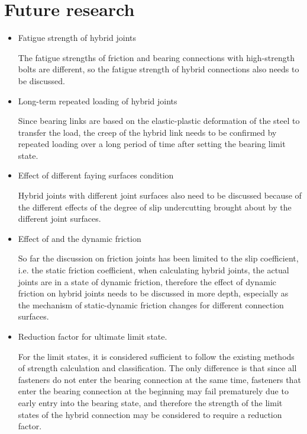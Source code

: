 \section{Future research}

\begin{itemize}


\item Fatigue strength of hybrid joints

The fatigue strengths of friction and bearing connections with high-strength bolts are different, so the fatigue strength of hybrid connections also needs to be discussed.

\item Long-term repeated loading of hybrid joints

Since bearing links are based on the elastic-plastic deformation of the steel to transfer the load, the creep of the hybrid link needs to be confirmed by repeated loading over a long period of time after setting the bearing limit state.

\item Effect of different faying surfaces condition

Hybrid joints with different joint surfaces also need to be discussed because of the different effects of the degree of slip undercutting brought about by the different joint surfaces.

\item Effect of and the dynamic friction

So far the discussion on friction joints has been limited to the slip coefficient, i.e. the static friction coefficient, when calculating hybrid joints, the actual joints are in a state of dynamic friction, therefore the effect of dynamic friction on hybrid joints needs to be discussed in more depth, especially as the mechanism of static-dynamic friction changes for different connection surfaces.

\item Reduction factor for ultimate limit state.

For the limit states, it is considered sufficient to follow the existing methods of strength calculation and classification. The only difference is that since all fasteners do not enter the bearing connection at the same time, fasteners that enter the bearing connection at the beginning may fail prematurely due to early entry into the bearing state, and therefore the strength of the limit states of the hybrid connection may be considered to require a reduction factor.

\end{itemize}
